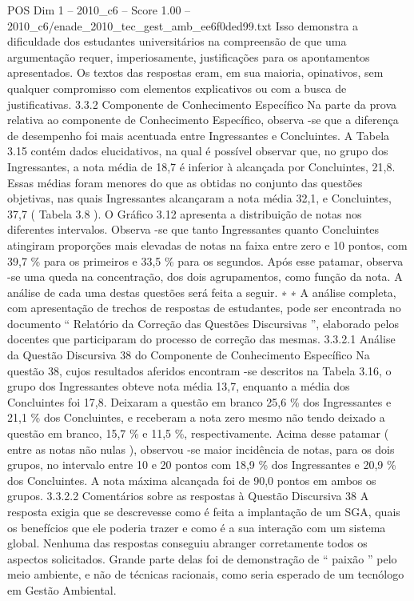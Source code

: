\begin{textsample}{POS Dim 1 – 2010\_c6 – Score 1.00 – 2010\_c6/enade\_2010\_tec\_gest\_amb\_ee6f0ded99.txt}
Isso demonstra a dificuldade dos estudantes universitários na compreensão de que uma argumentação requer, imperiosamente, justificações para os apontamentos apresentados.
Os textos das respostas eram, em sua maioria, opinativos, sem qualquer compromisso com elementos explicativos ou com a busca de justificativas. 3.3.2 Componente de Conhecimento Específico Na parte da prova relativa ao componente de Conhecimento Específico, observa -se que a diferença de desempenho foi mais acentuada entre Ingressantes e Concluintes.
A Tabela 3.15 contém dados elucidativos, na qual é possível observar que, no grupo dos Ingressantes, a nota média de 18,7 é inferior à alcançada por Concluintes, 21,8.
Essas médias foram menores do que as obtidas no conjunto das questões objetivas, nas quais Ingressantes alcançaram a nota média 32,1, e Concluintes, 37,7 ( Tabela 3.8 ).
O Gráfico 3.12 apresenta a distribuição de notas nos diferentes intervalos.
Observa -se que tanto Ingressantes quanto Concluintes atingiram proporções mais elevadas de notas na faixa entre zero e 10 pontos, com 39,7 \% para os primeiros e 33,5 \% para os segundos.
Após esse patamar, observa -se uma queda na concentração, dos dois agrupamentos, como função da nota.
A análise de cada uma destas questões será feita a seguir. ∗ ∗ A análise completa, com apresentação de trechos de respostas de estudantes, pode ser encontrada no documento “ Relatório da Correção das Questões Discursivas ”, elaborado pelos docentes que participaram do processo de correção das mesmas. 3.3.2.1 Análise da Questão Discursiva 38 do Componente de Conhecimento Específico Na questão 38, cujos resultados aferidos encontram -se descritos na Tabela 3.16, o grupo dos Ingressantes obteve nota média 13,7, enquanto a média dos Concluintes foi 17,8.
Deixaram a questão em branco 25,6 \% dos Ingressantes e 21,1 \% dos Concluintes, e receberam a nota zero mesmo não tendo deixado a questão em branco, 15,7 \% e 11,5 \%, respectivamente.
Acima desse patamar ( entre as notas não nulas ), observou -se maior incidência de notas, para os dois grupos, no intervalo entre 10 e 20 pontos com 18,9 \% dos Ingressantes e 20,9 \% dos Concluintes.
A nota máxima alcançada foi de 90,0 pontos em ambos os grupos. 3.3.2.2 Comentários sobre as respostas à Questão Discursiva 38 A resposta exigia que se descrevesse como é feita a implantação de um SGA, quais os benefícios que ele poderia trazer e como é a sua interação com um sistema global.
Nenhuma das respostas conseguiu abranger corretamente todos os aspectos solicitados.
Grande parte delas foi de demonstração de “ paixão ” pelo meio ambiente, e não de técnicas racionais, como seria esperado de um tecnólogo em Gestão Ambiental.

\end{textsample}
